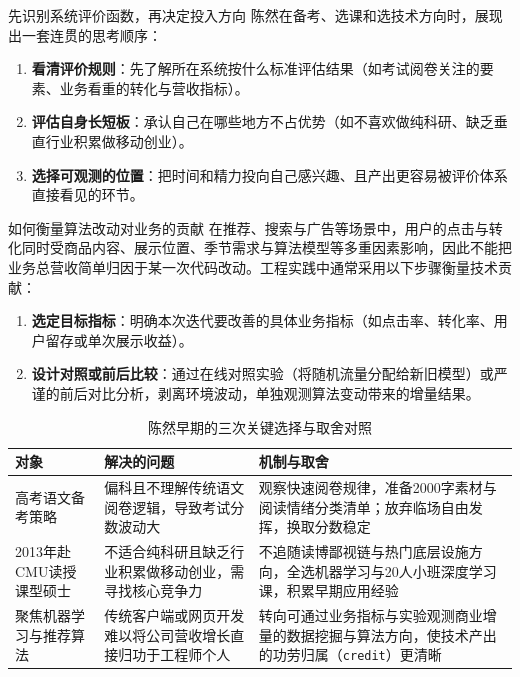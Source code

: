 \documentclass[UTF8,a4paper,11pt,fontset=fandol]{ctexart}
\begin{document}
\begin{knowledgebox}{先识别系统评价函数，再决定投入方向}
陈然在备考、选课和选技术方向时，展现出一套连贯的思考顺序：
\begin{enumerate}
\item \textbf{看清评价规则}：先了解所在系统按什么标准评估结果（如考试阅卷关注的要素、业务看重的转化与营收指标）。
\item \textbf{评估自身长短板}：承认自己在哪些地方不占优势（如不喜欢做纯科研、缺乏垂直行业积累做移动创业）。
\item \textbf{选择可观测的位置}：把时间和精力投向自己感兴趣、且产出更容易被评价体系直接看见的环节。
\end{enumerate}
\end{knowledgebox}
\begin{importantbox}{如何衡量算法改动对业务的贡献}
在推荐、搜索与广告等场景中，用户的点击与转化同时受商品内容、展示位置、季节需求与算法模型等多重因素影响，因此不能把业务总营收简单归因于某一次代码改动。工程实践中通常采用以下步骤衡量技术贡献：
\begin{enumerate}
\item \textbf{选定目标指标}：明确本次迭代要改善的具体业务指标（如点击率、转化率、用户留存或单次展示收益）。
\item \textbf{设计对照或前后比较}：通过在线对照实验（将随机流量分配给新旧模型）或严谨的前后对比分析，剥离环境波动，单独观测算法变动带来的增量结果。
\end{enumerate}
\end{importantbox}
\begin{table}[H]\centering\small
\caption{陈然早期的三次关键选择与取舍对照}
\begin{tabular}{>{\raggedright\arraybackslash}p{\dimexpr(\linewidth-6\tabcolsep)/3\relax}>{\raggedright\arraybackslash}p{\dimexpr(\linewidth-6\tabcolsep)/3\relax}>{\raggedright\arraybackslash}p{\dimexpr(\linewidth-6\tabcolsep)/3\relax}}
\toprule
对象 & 解决的问题 & 机制与取舍\\\midrule
高考语文备考策略 & 偏科且不理解传统语文阅卷逻辑，导致考试分数波动大 & 观察快速阅卷规律，准备2000字素材与阅读情绪分类清单；放弃临场自由发挥，换取分数稳定\\[4pt]
2013年赴CMU读授课型硕士 & 不适合纯科研且缺乏行业积累做移动创业，需寻找核心竞争力 & 不追随读博鄙视链与热门底层设施方向，全选机器学习与20人小班深度学习课，积累早期应用经验\\[4pt]
聚焦机器学习与推荐算法 & 传统客户端或网页开发难以将公司营收增长直接归功于工程师个人 & 转向可通过业务指标与实验观测商业增量的数据挖掘与算法方向，使技术产出的功劳归属（\texttt{credit}）更清晰\\[4pt]
\bottomrule\end{tabular}\end{table}
\end{document}
